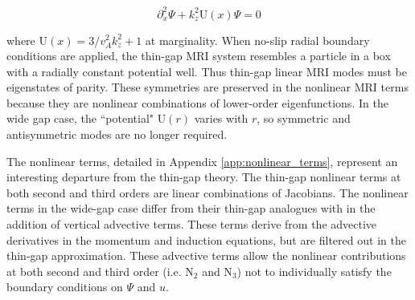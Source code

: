 \documentclass{emulateapj}
\newcommand{\beq}{\begin{equation}}
\newcommand{\eeq}{\end{equation}}
\begin{document}
\beq
\partial_x^2 \Psi + k_z^2 \mathrm{U}(x) \Psi = 0
\eeq 

where $\mathrm{U}(x) = {3}/{v_A^2 k_z^2} + 1$ at marginality. When no-slip radial boundary conditions are applied, the thin-gap MRI system resembles a particle in a box with a radially constant potential well. Thus thin-gap linear MRI modes must be eigenstates of parity. These symmetries are preserved in the nonlinear MRI terms because they are nonlinear combinations of lower-order eigenfunctions. In the wide gap case, the ``potential" $\mathrm{U}(r)$ varies with $r$, so symmetric and antisymmetric modes are no longer required.

The nonlinear terms, detailed in Appendix \ref{app:nonlinear_terms}, represent an interesting departure from the thin-gap theory. The thin-gap nonlinear terms at both second and third orders are linear combinations of Jacobians. The nonlinear terms in the wide-gap case differ from their thin-gap analogues with in the addition of vertical advective terms. These terms derive from the advective derivatives in the momentum and induction equations, but are filtered out in the thin-gap approximation. These advective terms allow the nonlinear contributions at both second and third order (i.e. N$_2$ and N$_3$) not to individually satisfy the boundary conditions on $\Psi$ and $u$. %
\end{document}
